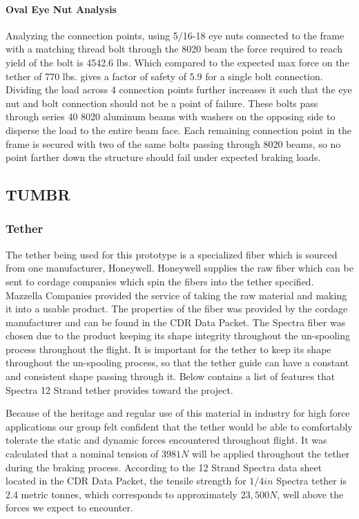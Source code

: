 \paragraph{Oval Eye Nut Analysis} Analyzing the connection points, using 5/16-18 eye nuts connected to the frame with a matching thread bolt through the 8020 beam the force required to reach yield of the bolt is 4542.6 lbs. Which compared to the expected max force on the tether of 770 lbs. gives a factor of safety of 5.9 for a single bolt connection. Dividing the load across 4 connection points further increases it such that the eye nut and bolt connection should not be a point of failure. These bolts pass through series 40 8020 aluminum beams with washers on the opposing side to disperse the load to the entire beam face. Each remaining connection point in the frame is secured with two of the same bolts passing through 8020 beams, so no point farther down the structure should fail under expected braking loads.

\subsection{TUMBR}

\subsubsection{Tether}

\indent\indent The tether being used for this prototype is a specialized fiber which is sourced from one manufacturer, Honeywell. Honeywell supplies the raw fiber which can be sent to cordage companies which spin the fibers into the tether specified. Mazzella Companies provided the service of taking the raw material and making it into a usable product. The properties of the fiber was provided by the cordage manufacturer and can be found in the CDR Data Packet. The Spectra fiber was chosen due to the product keeping its shape integrity throughout the un-spooling process throughout the flight. It is important for the tether to keep its shape throughout the un-spooling process, so that the tether guide can have a constant and consistent shape passing through it. Below contains a list of features that Spectra 12 Strand tether provides toward the project.

\indent\indent Because of the heritage and regular use of this material in industry for high force applications our group felt confident that the tether would be able to comfortably tolerate the static and dynamic forces encountered throughout flight. It was calculated that a nominal tension of $3981 N$ will be applied throughout the tether during the braking process. According to the 12 Strand Spectra data sheet located in the CDR Data Packet, the tensile strength for $1/4 in$ Spectra tether is 2.4 metric tonnes, which corresponds to approximately $23,500 N$, well above the forces we expect to encounter. 

